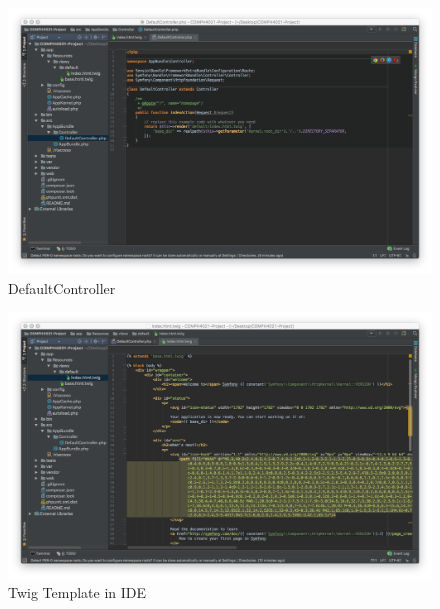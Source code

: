 \begin{figure}[htbp]
   \centering
   \includegraphics[width=400pt]{figures/default_controller.png} %
   \caption{DefaultController}
   \label{fig:DefaultController}
\end{figure}

\begin{figure}[htbp]
   \centering
   \includegraphics[width=400pt]{figures/twig_index.png} %
   \caption{Twig Template in IDE}
   \label{fig:Twig Template in IDE}
\end{figure}

